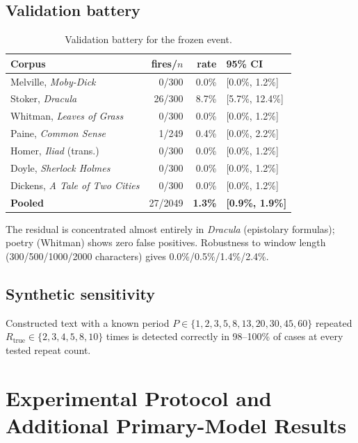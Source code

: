 \documentclass[make,article,submit,pdftex]{Definitions/mdpi}
\begin{document}
\subsection{Validation battery}
\begin{table}[H]
\centering
\caption{Validation battery for the frozen event.}
\label{tab:validation}
\begin{tabular}{@{}lrrl@{}}
\toprule
Corpus & fires/$n$ & rate & 95\% CI \\
\midrule
Melville, \emph{Moby-Dick}      & 0/300  & 0.0\% & [0.0\%, 1.2\%] \\
Stoker, \emph{Dracula}          & 26/300 & 8.7\% & [5.7\%, 12.4\%] \\
Whitman, \emph{Leaves of Grass} & 0/300  & 0.0\% & [0.0\%, 1.2\%] \\
Paine, \emph{Common Sense}      & 1/249  & 0.4\% & [0.0\%, 2.2\%] \\
Homer, \emph{Iliad} (trans.)    & 0/300  & 0.0\% & [0.0\%, 1.2\%] \\
Doyle, \emph{Sherlock Holmes}   & 0/300  & 0.0\% & [0.0\%, 1.2\%] \\
Dickens, \emph{A Tale of Two Cities} & 0/300 & 0.0\% & [0.0\%, 1.2\%] \\
\midrule
\textbf{Pooled}                 & 27/2049 & \textbf{1.3\%} & \textbf{[0.9\%, 1.9\%]} \\
\bottomrule
\end{tabular}
\end{table}
The residual is concentrated almost entirely in \emph{Dracula} (epistolary formulas); poetry (Whitman) shows zero false positives. Robustness to window length (300/500/1000/2000 characters) gives 0.0\%/0.5\%/1.4\%/2.4\%.

\subsection{Synthetic sensitivity}
Constructed text with a known period $P\in\{1,\allowbreak2,\allowbreak3,\allowbreak5,\allowbreak8,\allowbreak13,\allowbreak20,\allowbreak30,\allowbreak45,\allowbreak60\}$ repeated $R_{\text{true}}\in\{2,\allowbreak3,\allowbreak4,\allowbreak5,\allowbreak8,\allowbreak10\}$ times is detected correctly in 98--100\% of cases at every tested repeat count.



\section{Experimental Protocol and Additional Primary-Model Results}
\label{sec:protocol}
\end{document}
